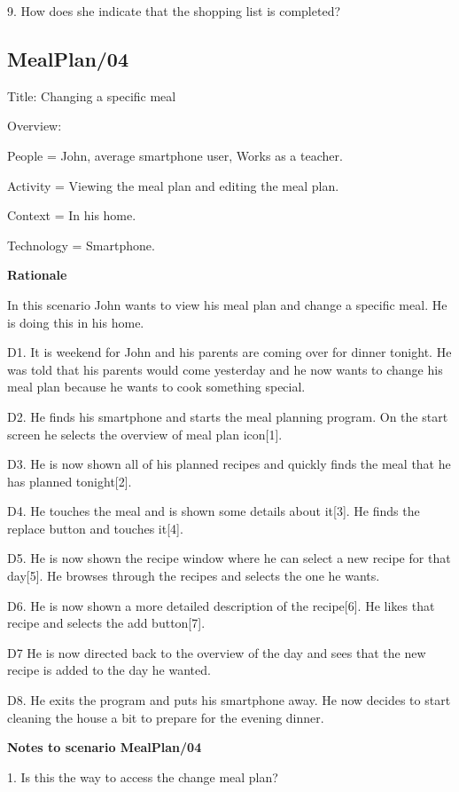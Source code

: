 9. How does she indicate that the shopping list is completed?

\subsection{MealPlan/04} \label{MealPlan04}

Title: Changing a specific meal

Overview:
	
	People = John, average smartphone user, Works as a teacher.
	
	Activity = Viewing the meal plan and editing the meal plan.
	
	Context = In his home. 
	
	Technology = Smartphone.
	
\textbf{Rationale}

In this scenario John wants to view his meal plan and change a specific meal. He is doing this in his home.

	D1. It is weekend for John and his parents are coming over for dinner tonight. He was told that his parents would come yesterday and he now wants to change his meal plan because he wants to cook something special.
	
	D2. He finds his smartphone and starts the meal planning program. On the start screen he selects the overview of meal plan icon[1].
	
	D3. He is now shown all of his planned recipes and quickly finds the meal that he has planned tonight[2].
	
	D4. He touches the meal and is shown some details about it[3]. He finds the replace button and touches it[4].
	
	D5. He is now shown the recipe window where he can select a new recipe for that day[5]. He browses through the recipes and selects the one he wants. 

	D6. He is now shown a more detailed description of the recipe[6]. He likes that recipe and selects the add button[7].

	D7 He is now directed back to the overview of the day and sees that the new recipe is added to the day he wanted.
	
	D8. He exits the program and puts his smartphone away. He now decides to start cleaning the house a bit to prepare for the evening dinner.
	
\textbf{Notes to scenario MealPlan/04}

1. Is this the way to access the change meal plan?

